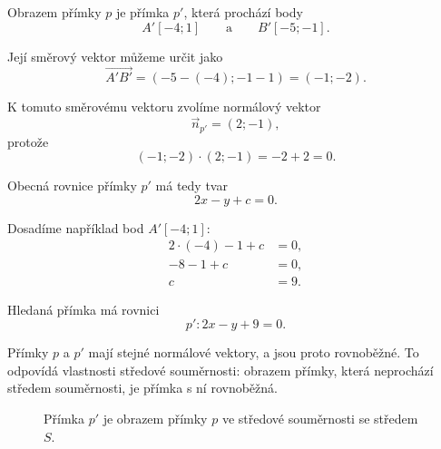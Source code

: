 \begin{example}
    Obrazem přímky $p$ je přímka $p'$, která prochází body
    \[
        A'[-4;1]
        \qquad\text{a}\qquad
        B'[-5;-1].
    \]

    Její směrový vektor můžeme určit jako
    \[
        \overrightarrow{A'B'}
        =
        (-5-(-4);-1-1)
        =
        (-1;-2).
    \]

    K tomuto směrovému vektoru zvolíme normálový vektor
    \[
        \vec{n}_{p'}=(2;-1),
    \]
    protože
    \[
        (-1;-2)\cdot(2;-1)
        =
        -2+2
        =
        0.
    \]

    Obecná rovnice přímky $p'$ má tedy tvar
    \[
        2x-y+c=0.
    \]

    Dosadíme například bod $A'[-4;1]$:
    \begin{align*}
        2\cdot(-4)-1+c&=0,\\
        -8-1+c&=0,\\
        c&=9.
    \end{align*}

    Hledaná přímka má rovnici
    \[
        p':2x-y+9=0.
    \]

    Přímky $p$ a $p'$ mají stejné normálové vektory, a jsou proto
    rovnoběžné. To odpovídá vlastnosti středové souměrnosti: obrazem
    přímky, která neprochází středem souměrnosti, je přímka s ní
    rovnoběžná.

    \begin{figure}[H]
        \centering
        \caption{Přímka $p'$ je obrazem přímky $p$ ve středové
        souměrnosti se středem $S$.}
        \label{fig:Central_symmetry_line}
    \end{figure}
\end{example}